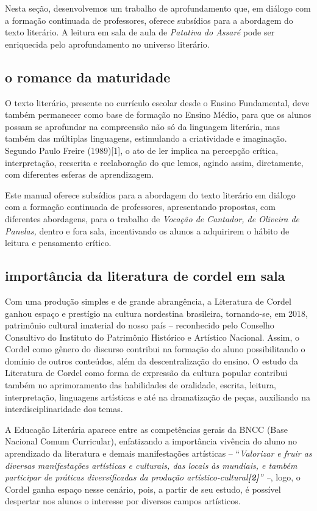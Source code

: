 \documentclass[12pt]{extarticle}
\begin{document}
Nesta seção, desenvolvemos um trabalho de aprofundamento que, em diálogo
com a formação continuada de professores, oferece subsídios para a
abordagem do texto literário. A leitura em sala de aula de
\emph{Patativa do Assaré} pode ser enriquecida pelo aprofundamento no
universo literário.

\subsection{o romance da maturidade}

O texto literário, presente no currículo escolar desde o Ensino
Fundamental, deve também permanecer como base de formação no Ensino
Médio, para que os alunos possam se aprofundar na compreensão não só da
linguagem literária, mas também das múltiplas linguagens, estimulando a
criatividade e imaginação. Segundo Paulo Freire (1989){[}1{]}, o ato de
ler implica na percepção crítica, interpretação, reescrita e
reelaboração do que lemos, agindo assim, diretamente, com diferentes
esferas de aprendizagem.

Este manual oferece subsídios para a abordagem do texto literário em
diálogo com a formação continuada de professores, apresentando
propostas, com diferentes abordagens, para o trabalho de \emph{Vocação
de Cantador, de Oliveira de Panelas,} dentro e fora sala, incentivando
os alunos a adquirirem o hábito de leitura e pensamento crítico.

\subsection{importância da literatura de cordel em sala}

Com uma produção simples e de grande abrangência, a Literatura de Cordel
ganhou espaço e prestígio na cultura nordestina brasileira, tornando-se,
em 2018, patrimônio cultural imaterial do nosso país -- reconhecido pelo
Conselho Consultivo do Instituto do Patrimônio Histórico e Artístico
Nacional. Assim, o Cordel como gênero do discurso contribui na formação
do aluno possibilitando o domínio de outros conteúdos, além da
descentralização do ensino. O estudo da Literatura de Cordel como forma
de expressão da cultura popular contribui também no aprimoramento das
habilidades de oralidade, escrita, leitura, interpretação, linguagens
artísticas e até na dramatização de peças, auxiliando na
interdisciplinaridade dos temas.

A Educação Literária aparece entre as competências gerais da BNCC (Base
Nacional Comum Curricular), enfatizando a importância vivência do aluno
no aprendizado da literatura e demais manifestações artísticas --
``\emph{Valorizar e fruir as diversas manifestações artísticas e
culturais, das locais às mundiais, e também participar de práticas
diversificadas da produção artístico-cultural\textbf{{[}2{]}}'' --},
logo, o Cordel ganha espaço nesse cenário, pois, a partir de seu estudo,
é possível despertar nos alunos o interesse por diversos campos
artísticos.
\end{document}
